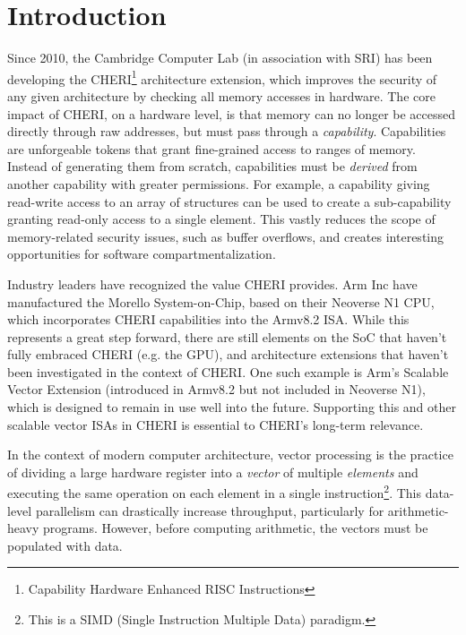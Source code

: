 \chapter{Introduction}

Since 2010, the Cambridge Computer Lab (in association with SRI) has been developing the  CHERI\footnote{Capability Hardware Enhanced RISC Instructions} architecture extension, which improves the security of any given architecture by checking all memory accesses in hardware.
The core impact of CHERI, on a hardware level, is that memory can no longer be accessed directly through raw addresses, but must pass through a \emph{capability}.
Capabilities are unforgeable tokens that grant fine-grained access to ranges of memory.
Instead of generating them from scratch, capabilities must be \emph{derived} from another capability with greater permissions.
For example, a capability giving read-write access to an array of structures can be used to create a sub-capability granting read-only access to a single element.
This vastly reduces the scope of memory-related security issues, such as buffer overflows, and creates interesting opportunities for software compartmentalization.

Industry leaders have recognized the value CHERI provides.
Arm Inc have manufactured the Morello System-on-Chip, based on their Neoverse N1 CPU, which incorporates CHERI capabilities into the Armv8.2 ISA.
While this represents a great step forward, there are still elements on the SoC that haven't fully embraced CHERI (e.g. the GPU), and architecture extensions that haven't been investigated in the context of CHERI.
One such example is Arm's Scalable Vector Extension (introduced in Armv8.2 but not included in Neoverse N1), which is designed to remain in use well into the future.
Supporting this and other scalable vector ISAs in CHERI is essential to CHERI's long-term relevance.

In the context of modern computer architecture, vector processing is the practice of dividing a large hardware register into a \emph{vector} of multiple \emph{elements} and executing the same operation on each element in a single instruction\footnote{This is a SIMD (Single Instruction Multiple Data) paradigm.}.
This data-level parallelism can drastically increase throughput, particularly for arithmetic-heavy programs.
However, before computing arithmetic, the vectors must be populated with data.

